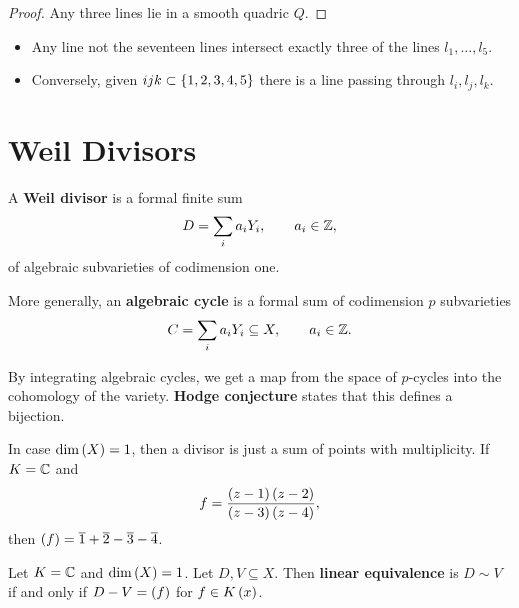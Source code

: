 \begin{proof}
Any three lines lie in a smooth quadric $ Q $.
\end{proof}

\begin{lemma}
\hfill
\begin{itemize}
\item Any line not the seventeen lines intersect exactly three of the lines $ l_1, \dots, l_5 $.
\item Conversely, given $ ijk \subset \left\{ 1, 2, 3, 4, 5 \right\} $ there is a line passing through $ l_i, l_j, l_k $.
\end{itemize}
\end{lemma}

\pagebreak

\section{Weil Divisors}


\begin{definition}
A \textbf{Weil divisor} is a formal finite sum
$$ D = \sum_i a_iY_i, \qquad a_i \in \mathbb{Z}, $$
of algebraic subvarieties of codimension one.
\end{definition}

\begin{definition}
More generally, an \textbf{algebraic cycle} is a formal sum of codimension $ p $ subvarieties
$$ C = \sum_i a_iY_i \subseteq X, \qquad a_i \in \mathbb{Z}. $$
\end{definition}

By integrating algebraic cycles, we get a map from the space of $ p $-cycles into the cohomology of the variety. \textbf{Hodge conjecture} states that this defines a bijection.

\begin{example}
In case $ \dim\left( X \right) = 1 $, then a divisor is just a sum of points with multiplicity. If $ K = \mathbb{C} $ and
$$ f = \dfrac{\left( z - 1 \right)\left( z - 2 \right)}{\left( z - 3 \right)\left( z - 4 \right)}, $$
then $ \left( f \right) = \overline{1} + \overline{2} - \overline{3} - \overline{4} $.
\end{example}

\begin{definition}
Let $ K = \mathbb{C} $ and $ \dim\left( X \right) = 1 $. Let $ D, V \subseteq X $. Then \textbf{linear equivalence} is $ D \sim V $ if and only if $ D - V = \left( f \right) $ for $ f \in K\left( x \right) $.
\end{definition}

